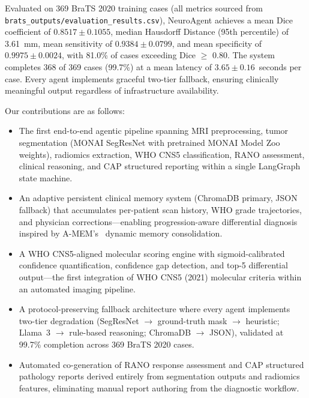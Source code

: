 Evaluated on 369 BraTS 2020 training cases (all metrics sourced from \texttt{brats\_outputs/evaluation\_results.csv}), NeuroAgent achieves a mean Dice coefficient of $0.8517 \pm 0.1055$, median Hausdorff Distance (95th percentile) of 3.61~mm, mean sensitivity of $0.9384 \pm 0.0799$, and mean specificity of $0.9975 \pm 0.0024$, with 81.0\% of cases exceeding Dice $\geq$ 0.80. The system completes 368 of 369 cases (99.7\%) at a mean latency of $3.65 \pm 0.16$~seconds per case. Every agent implements graceful two-tier fallback, ensuring clinically meaningful output regardless of infrastructure availability.

Our contributions are as follows:
\begin{itemize}
    \item[\textbf{C1}] The first end-to-end agentic pipeline spanning MRI preprocessing, tumor segmentation (MONAI SegResNet with pretrained MONAI Model Zoo weights), radiomics extraction, WHO CNS5 classification, RANO assessment, clinical reasoning, and CAP structured reporting within a single LangGraph state machine.
    \item[\textbf{C2}] An adaptive persistent clinical memory system (ChromaDB primary, JSON fallback) that accumulates per-patient scan history, WHO grade trajectories, and physician corrections---enabling progression-aware differential diagnosis inspired by A-MEM's~\cite{amem2024} dynamic memory consolidation.
    \item[\textbf{C3}] A WHO CNS5-aligned molecular scoring engine with sigmoid-calibrated confidence quantification, confidence gap detection, and top-5 differential output---the first integration of WHO CNS5 (2021) molecular criteria within an automated imaging pipeline.
    \item[\textbf{C4}] A protocol-preserving fallback architecture where every agent implements two-tier degradation (SegResNet $\rightarrow$ ground-truth mask $\rightarrow$ heuristic; Llama~3 $\rightarrow$ rule-based reasoning; ChromaDB $\rightarrow$ JSON), validated at 99.7\% completion across 369 BraTS 2020 cases.
    \item[\textbf{C5}] Automated co-generation of RANO response assessment and CAP structured pathology reports derived entirely from segmentation outputs and radiomics features, eliminating manual report authoring from the diagnostic workflow.
\end{itemize}


